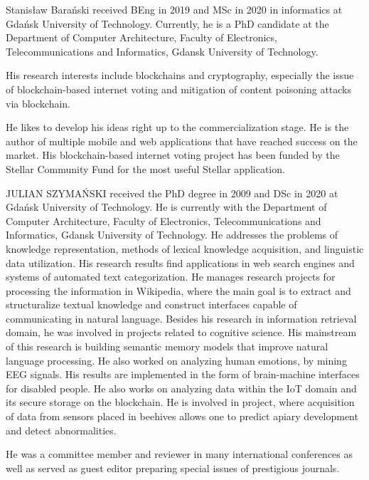 \documentclass{ieeeaccess}
\begin{document}


\EOD



\begin{IEEEbiography}{Stanis\l{}aw Bara{\'n}ski} received BEng in 2019 and MSc in 2020 in informatics at Gdańsk University of Technology. 
Currently, he is a PhD candidate at the Department of Computer Architecture, Faculty of Electronics, Telecommunications and Informatics, Gdansk University of Technology.

His research interests include blockchains and cryptography, especially the issue of blockchain-based internet voting and mitigation of content poisoning attacks via blockchain.

He likes to develop his ideas right up to the commercialization stage. He is the author of multiple mobile and web applications that have reached success on the market. His blockchain-based internet voting project has been funded by the Stellar Community Fund for the most useful Stellar application. 
\end{IEEEbiography}

\begin{IEEEbiography}{JULIAN SZYMA{\'N}SKI}  received the PhD degree in 2009 and DSc in 2020 at Gdańsk University of Technology.
He is currently with the Department of Computer
Architecture, Faculty of Electronics, Telecommunications and Informatics, Gdansk University of Technology. He addresses the problems of knowledge representation, methods of lexical knowledge acquisition, and linguistic data utilization.
His research results find applications in web search engines and systems of automated text categorization. He manages research projects for processing the information in Wikipedia, where the main goal is to extract and structuralize textual knowledge and construct interfaces capable of communicating in natural language. Besides his research in information retrieval domain, he was involved in projects related to cognitive science. His mainstream of this research is building semantic memory models that improve natural language processing. He also worked on analyzing
human emotions, by mining EEG signals. His results are implemented in
the form of brain-machine interfaces for disabled people. He also works
on analyzing data within the IoT domain and its secure storage on the blockchain. 
He is involved in project, where acquisition of data from sensors placed in beehives  allows one to predict apiary development and detect abnormalities. 

He was a committee member and reviewer in  many international
conferences as well as served as guest editor preparing special issues of prestigious journals. 

\end{IEEEbiography}
\end{document}
